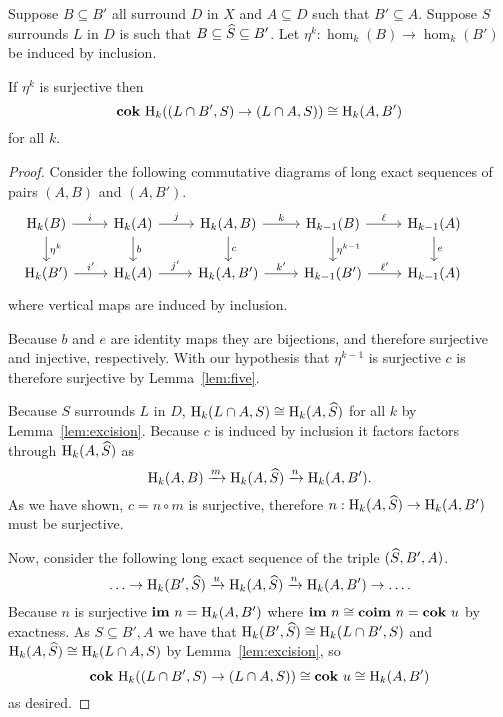 \documentclass[12pt]{article}
\begin{document}
\begin{theorem}\label{thm:separate_iso_coker}
  Suppose $B\subseteq B'$ all surround $D$ in $X$ and $A\subseteq D$ such that $B'\subseteq A$.
  Suppose $S$ surrounds $L$ in $D$ is such that $B\subseteq \widehat{S} \subseteq B'$.
  Let $\eta^k : \hom_k(B)\to \hom_k(B')$ be induced by inclusion.

  If $\eta^k$ is surjective then
  \[\mathbf{cok}~\mathrm{H}_k((L\cap B', S)\to (L\cap A, S))\cong \mathrm{H}_k(A, B')\]
  for all $k$.
\end{theorem}
\begin{proof}
  Consider the following commutative diagrams of long exact sequences of pairs $(A, B)$ and $(A, B')$.
  \begin{equation}\begin{tikzcd}\label{dgm:separate_iso}
    \hom_k(B)\arrow{r}{i}\arrow{d}{\eta^k} &
    \hom_k(A)\arrow{r}{j}\arrow{d}{b} &
    \hom_k(A, B)\arrow{r}{k}\arrow{d}{c} &
    \hom_{k-1}(B)\arrow{r}{\ell}\arrow{d}{\eta^{k-1}} &
    \hom_{k-1}(A)\arrow{d}{e} &\\
    \hom_k(B')\arrow{r}{i'} &
    \hom_k(A)\arrow{r}{j'} &
    \hom_k(A, B')\arrow{r}{k'} &
    \hom_{k-1}(B')\arrow{r}{\ell'} &
    \hom_{k-1}(A)
  \end{tikzcd}\end{equation}
  where vertical maps are induced by inclusion.

  Because $b$ and $e$ are identity maps they are bijections, and therefore surjective and injective, respectively.
  With our hypothesis that $\eta^{k-1}$ is surjective $c$ is therefore surjective by Lemma~\ref{lem:five}.

  Because $S$ surrounds $L$ in $D$, $\mathrm{H}_k(L\cap A, S)\cong \mathrm{H}_k(A, \widehat{S})$ for all $k$ by Lemma~\ref{lem:excision}.
  Because $c$ is induced by inclusion it factors factors through $\mathrm{H}_k(A, \widehat{S})$ as
  \[ \mathrm{H}_k(A, B)\xrightarrow{m}\mathrm{H}_k(A, \widehat{S})\xrightarrow{n}\mathrm{H}_k(A, B').\]
  As we have shown, $c = n\circ m$ is surjective, therefore $n : \mathrm{H}_k(A, \widehat{S}) \to \mathrm{H}_k(A, B')$ must be surjective.

  Now, consider the following long exact sequence of the triple $(\widehat{S}, B', A)$.
  \[\ldots\to \mathrm{H}_k(B', \widehat{S})\xrightarrow{u} \mathrm{H}_k(A, \widehat{S})\xrightarrow{n}\mathrm{H}_k(A, B')\to\ldots.\]
  Because $n$ is surjective $\mathbf{im}~n = \mathrm{H}_k(A, B')$ where $\mathbf{im}~n\cong \mathbf{coim}~n = \mathbf{cok}~u$ by exactness.
  As $S\subseteq B', A$ we have that $\mathrm{H}_k(B', \widehat{S})\cong \mathrm{H}_k(L\cap B', S)$ and $\mathrm{H}_k(A, \widehat{S})\cong \mathrm{H}_k(L\cap A, S)$ by Lemma~\ref{lem:excision}, so
  \[ \mathbf{cok}~\mathrm{H}_k((L\cap B', S)\to (L\cap A, S))\cong \mathbf{cok}~u\cong \mathrm{H}_k(A, B') \]
  as desired.
\end{proof}
\end{document}

